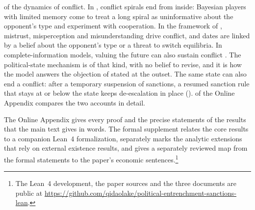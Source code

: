 of the dynamics of conflict. In \citet{AcemogluWolitzky2014}, conflict spirals
end from inside: Bayesian players with limited memory come to treat a long
spiral as uninformative about the opponent's type and experiment with
cooperation. In the framework of \citet{AcemogluWolitzkyMistrust}, mistrust,
misperception and misunderstanding drive conflict, and dates are linked by a
belief about the opponent's type or a threat to switch equilibria. In
complete-information models, valuing the future can also sustain conflict
\citep{SkaperdasSyropoulos1996,Powell2012}. The political-state mechanism is of
that kind, with no belief to revise, and it is how the model answers the
objection of \citet{Drezner2003} stated at the outset. The same state can also
end a conflict: after a temporary suspension of sanctions, a resumed sanction rule that
stays at or below the state keeps de-escalation in place
().
 of the Online Appendix compares the two accounts
in detail.

 The
Online Appendix gives every proof and the precise statements of the results that
the main text gives in words. The formal supplement relates the core results to a
companion Lean~4 formalization, separately marks the analytic extensions that
rely on external existence results, and gives a separately reviewed map from the
formal statements to the paper's economic sentences.\footnote{The Lean~4 development, the
paper sources and the three documents are public at \url{https://github.com/qidaolake/political-entrenchment-sanctions-lean}.}

